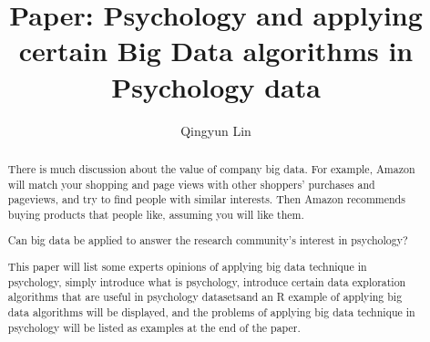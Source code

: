 

\def\paperstatus{60} %
\def\paperchapter{Application} %
\def\hid{hid-sp18-515} %
\def\volume{9} %

\def\locator{\hid, Volume: \volume, Chapter: \paperchapter, Status: \paperstatus. \newline}

\title{Paper: Psychology and applying certain Big Data algorithms in Psychology data}


\author{Qingyun Lin}


\renewcommand{\shortauthors}{G. v. Laszewski}


\begin{abstract}
There is much discussion about the value of company big data. 
For example, Amazon will match your shopping and page views with 
other shoppers’ purchases and pageviews, and try to find people with 
similar interests. Then Amazon recommends buying products that people 
like, assuming you will like them.

Can big data be applied to answer the research community’s interest 
in psychology?

This paper will list some experts opinions of applying big data 
technique in psychology, simply introduce what is psychology, 
introduce certain data exploration algorithms that are useful in 
psychology datasetsand an R example of applying big data algorithms 
will be displayed, and the problems of applying big data technique 
in psychology will be listed as examples at the end of the paper. 

\end{abstract}

